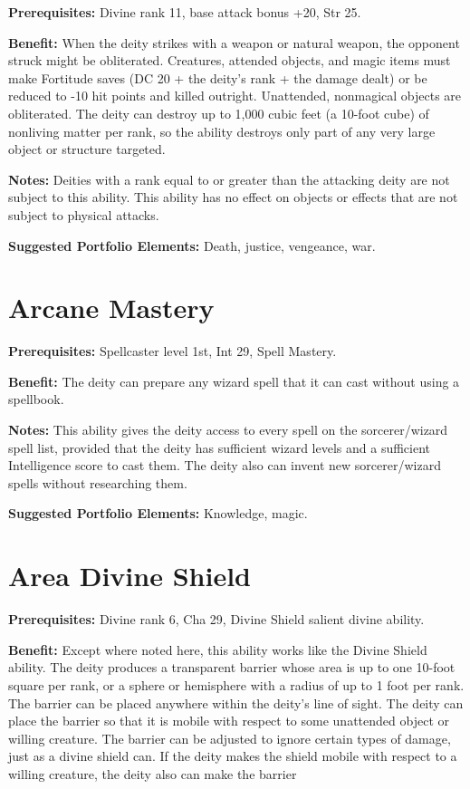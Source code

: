 \documentclass{article}
\begin{document}
\textbf{Prerequisites:} Divine rank 11, base attack bonus +20, Str 25.

\textbf{Benefit:} When the deity strikes with a weapon or natural weapon, the opponent 
struck might be obliterated. Creatures, attended objects, and magic items must 
make Fortitude saves (DC 20 + the deity's rank + the damage dealt) or be reduced 
to -10 hit points and killed outright. Unattended, nonmagical objects are obliterated. 
The deity can destroy up to 1,000 cubic feet (a 10-foot cube) of nonliving matter 
per rank, so the ability destroys only part of any very large object or structure 
targeted.

\textbf{Notes:} Deities with a rank equal to or greater than the attacking deity 
are not subject to this ability. This ability has no effect on objects or effects 
that are not subject to physical attacks.

\textbf{Suggested Portfolio Elements:} Death, justice, vengeance, war.

\vspace{12pt}
\section*{Arcane Mastery}

\textbf{Prerequisites:} Spellcaster level 1st, Int 29, Spell Mastery.

\textbf{Benefit:} The deity can prepare any wizard spell that it can cast without 
using a spellbook.

\textbf{Notes:} This ability gives the deity access to every spell on the sorcerer/wizard 
spell list, provided that the deity has sufficient wizard levels and a sufficient 
Intelligence score to cast them. The deity also can invent new sorcerer/wizard 
spells without researching them.

\textbf{Suggested Portfolio Elements:} Knowledge, magic.

\vspace{12pt}
\section*{Area Divine Shield}

\textbf{Prerequisites:} Divine rank 6, Cha 29, Divine Shield salient divine ability.

\textbf{Benefit:} Except where noted here, this ability works like the Divine Shield 
ability. The deity produces a transparent barrier whose area is up to one 10-foot 
square per rank, or a sphere or hemisphere with a radius of up to 1 foot per rank. 
The barrier can be placed anywhere within the deity's line of sight. The deity 
can place the barrier so that it is mobile with respect to some unattended object 
or willing creature. The barrier can be adjusted to ignore certain types of damage, 
just as a divine shield can. If the deity makes the shield mobile with respect 
to a willing creature, the deity also can make the barrier
\end{document}
